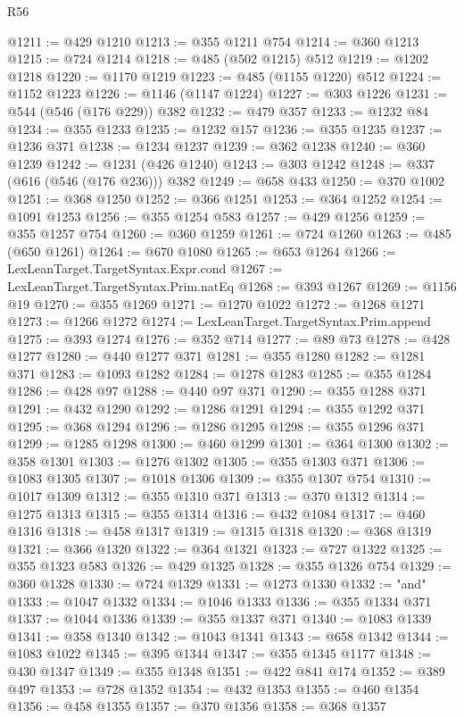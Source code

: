 \begin{lexlean}{R56}
\begin{coremodule}
@1211 := @429 @1210
@1213 := @355 @1211 @754
@1214 := @360 @1213
@1215 := @724 @1214
@1218 := @485 (@502 @1215) @512
@1219 := @1202 @1218
@1220 := @1170 @1219
@1223 := @485 (@1155 @1220) @512
@1224 := @1152 @1223
@1226 := @1146 (@1147 @1224)
@1227 := @303 @1226
@1231 := @544 (@546 (@176 @229)) @382
@1232 := @479 @357
@1233 := @1232 @84
@1234 := @355 @1233
@1235 := @1232 @157
@1236 := @355 @1235
@1237 := @1236 @371
@1238 := @1234 @1237
@1239 := @362 @1238
@1240 := @360 @1239
@1242 := @1231 (@426 @1240)
@1243 := @303 @1242
@1248 := @337 (@616 (@546 (@176 @236))) @382
@1249 := @658 @433
@1250 := @370 @1002
@1251 := @368 @1250
@1252 := @366 @1251
@1253 := @364 @1252
@1254 := @1091 @1253
@1256 := @355 @1254 @583
@1257 := @429 @1256
@1259 := @355 @1257 @754
@1260 := @360 @1259
@1261 := @724 @1260
@1263 := @485 (@650 @1261)
@1264 := @670 @1080
@1265 := @653 @1264
@1266 := LexLeanTarget.TargetSyntax.Expr.cond
@1267 := LexLeanTarget.TargetSyntax.Prim.natEq
@1268 := @393 @1267
@1269 := @1156 @19
@1270 := @355 @1269
@1271 := @1270 @1022
@1272 := @1268 @1271
@1273 := @1266 @1272
@1274 := LexLeanTarget.TargetSyntax.Prim.append
@1275 := @393 @1274
@1276 := @352 @714
@1277 := @89 @73
@1278 := @428 @1277
@1280 := @440 @1277 @371
@1281 := @355 @1280
@1282 := @1281 @371
@1283 := @1093 @1282
@1284 := @1278 @1283
@1285 := @355 @1284
@1286 := @428 @97
@1288 := @440 @97 @371
@1290 := @355 @1288 @371
@1291 := @432 @1290
@1292 := @1286 @1291
@1294 := @355 @1292 @371
@1295 := @368 @1294
@1296 := @1286 @1295
@1298 := @355 @1296 @371
@1299 := @1285 @1298
@1300 := @460 @1299
@1301 := @364 @1300
@1302 := @358 @1301
@1303 := @1276 @1302
@1305 := @355 @1303 @371
@1306 := @1083 @1305
@1307 := @1018 @1306
@1309 := @355 @1307 @754
@1310 := @1017 @1309
@1312 := @355 @1310 @371
@1313 := @370 @1312
@1314 := @1275 @1313
@1315 := @355 @1314
@1316 := @432 @1084
@1317 := @460 @1316
@1318 := @458 @1317
@1319 := @1315 @1318
@1320 := @368 @1319
@1321 := @366 @1320
@1322 := @364 @1321
@1323 := @727 @1322
@1325 := @355 @1323 @583
@1326 := @429 @1325
@1328 := @355 @1326 @754
@1329 := @360 @1328
@1330 := @724 @1329
@1331 := @1273 @1330
@1332 := "and"
@1333 := @1047 @1332
@1334 := @1046 @1333
@1336 := @355 @1334 @371
@1337 := @1044 @1336
@1339 := @355 @1337 @371
@1340 := @1083 @1339
@1341 := @358 @1340
@1342 := @1043 @1341
@1343 := @658 @1342
@1344 := @1083 @1022
@1345 := @395 @1344
@1347 := @355 @1345 @1177
@1348 := @430 @1347
@1349 := @355 @1348
@1351 := @422 @841 @174
@1352 := @389 @497
@1353 := @728 @1352
@1354 := @432 @1353
@1355 := @460 @1354
@1356 := @458 @1355
@1357 := @370 @1356
@1358 := @368 @1357

\end{coremodule}
\end{lexlean}
